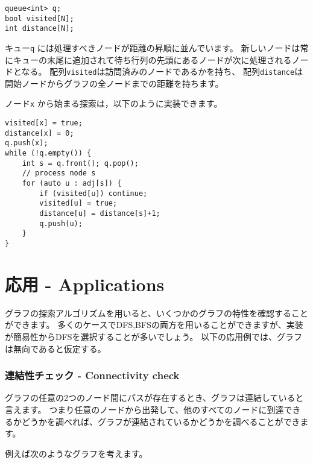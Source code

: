 \begin{lstlisting}
queue<int> q;
bool visited[N];
int distance[N];
\end{lstlisting}

キュー\texttt{q} には処理すべきノードが距離の昇順に並んでいます。
新しいノードは常にキューの末尾に追加されて待ち行列の先頭にあるノードが次に処理されるノードとなる。
配列\texttt{visited}は訪問済みのノードであるかを持ち、
配列\texttt{distance}は開始ノードからグラフの全ノードまでの距離を持ちます。

ノード\texttt{x} から始まる探索は，以下のように実装できます。
\begin{lstlisting}
visited[x] = true;
distance[x] = 0;
q.push(x);
while (!q.empty()) {
    int s = q.front(); q.pop();
    // process node s
    for (auto u : adj[s]) {
        if (visited[u]) continue;
        visited[u] = true;
        distance[u] = distance[s]+1;
        q.push(u);
    }
}
\end{lstlisting}


\section{応用 - Applications}


グラフの探索アルゴリズムを用いると、いくつかのグラフの特性を確認することができます。
多くのケースでDFS,BFSの両方を用いることができますが、実装が簡易性からDFSを選択することが多いでしょう。
以下の応用例では、グラフは無向であると仮定する。

\subsubsection{連結性チェック - Connectivity check}


グラフの任意の2つのノード間にパスが存在するとき、グラフは連結していると言えます。
つまり任意のノードから出発して、他のすべてのノードに到達できるかどうかを調べれば、グラフが連結されているかどうかを調べることができます。

例えば次のようなグラフを考えます。
\begin{center}
\end{center}

